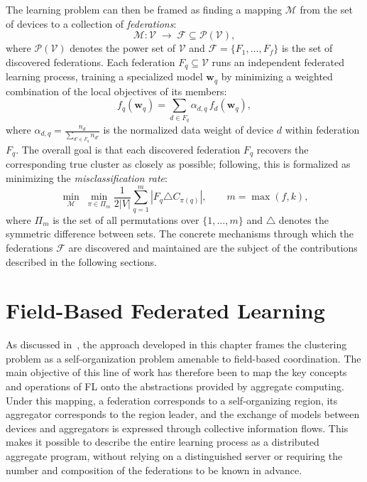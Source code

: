 The learning problem can then be framed as finding a mapping $\mathcal{M}$
 from the set of devices to a collection of \emph{federations}:
\begin{equation}
  \mathcal{M} : \mathcal{V} \;\rightarrow\; \mathcal{F} \subseteq \mathcal{P}(\mathcal{V}),
\end{equation}
where $\mathcal{P}(\mathcal{V})$ denotes the power set of $\mathcal{V}$
 and $\mathcal{F} = \{F_1, \ldots, F_f\}$ is the set of discovered federations.
%
Each federation $F_q \subseteq \mathcal{V}$ runs an independent federated learning process,
 training a specialized model $\mathbf{w}_q$ by minimizing a weighted combination
 of the local objectives of its members:
\begin{equation}
  f_q(\mathbf{w}_q) = \sum_{d \in F_q} \alpha_{d,q} \, f_d(\mathbf{w}_q),
  \label{eq:cluster-objective}
\end{equation}
where $\alpha_{d,q} = \frac{n_d}{\sum_{d' \in F_q} n_{d'}}$ is the normalized data weight
 of device $d$ within federation $F_q$.
%
The overall goal is that each discovered federation $F_q$ recovers the corresponding true cluster
 as closely as possible;
 following, this is formalized as minimizing the \emph{misclassification rate}:
\begin{equation}
\min_{\mathcal M}\;
\min_{\pi\in\Pi_m}
\frac{1}{2|V|}
\sum_{q=1}^{m}
\left|F_q\triangle C_{\pi(q)}\right|,
\qquad m=\max(f,k),
\label{eq:misclassification}
\end{equation}
where $\Pi_m$ is the set of all permutations over $\{1, \ldots, m\}$
 and $\triangle$ denotes the symmetric difference between sets.
%
The concrete mechanisms through which the federations $\mathcal{F}$ are discovered
 and maintained are the subject of the contributions described in the following sections. 

\section{Field-Based Federated Learning}
\label{sec:selforgfl-approach}

As discussed in~, 
 the approach developed in this chapter frames the clustering problem as a self-organization problem 
 amenable to field-based coordination.
%
The main objective of this line of work has therefore been to map the key
concepts and operations of \gls{FL} onto the abstractions provided by aggregate
computing.
%
Under this mapping, a federation corresponds to a self-organizing region, its
aggregator corresponds to the region leader, and the exchange of models between
devices and aggregators is expressed through collective information flows.
%
This makes it possible to describe the entire learning process as a distributed
aggregate program, without relying on a distinguished server or requiring the
number and composition of the federations to be known in advance.

